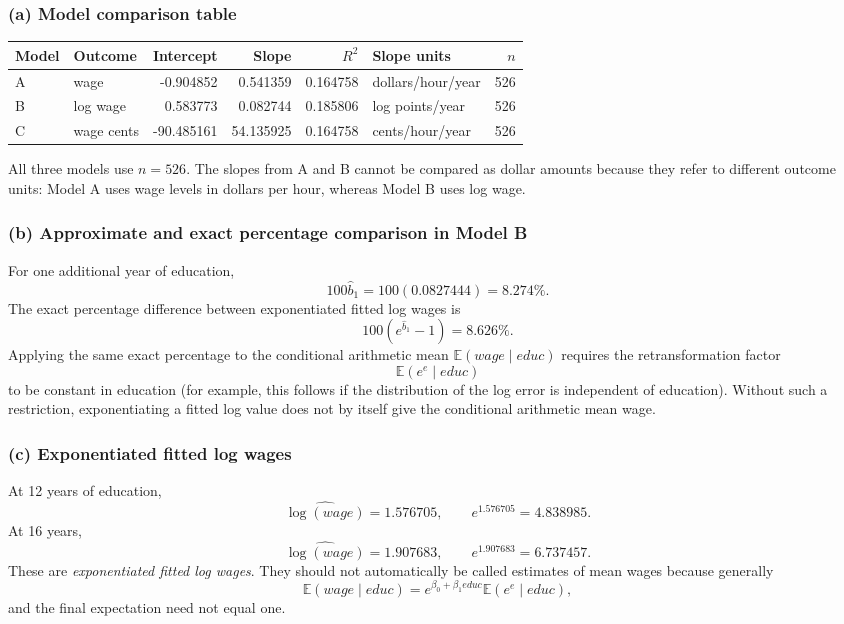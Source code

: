 \documentclass[11pt,a4paper]{article}
\newcommand{\E}{\mathbb{E}}
\begin{document}
\subsubsection*{(a) Model comparison table}
\begin{center}
\begin{tabular}{p{1.4cm}p{1.8cm}rrrp{3.2cm}r}
\toprule
Model & Outcome & Intercept & Slope & $R^2$ & Slope units & $n$\\
\midrule
A & wage & -0.904852 & 0.541359 & 0.164758 & dollars/hour/year & 526\\
B & log wage & 0.583773 & 0.082744 & 0.185806 & log points/year & 526\\
C & wage cents & -90.485161 & 54.135925 & 0.164758 & cents/hour/year & 526\\
\bottomrule
\end{tabular}
\end{center}
All three models use $n=526$. The slopes from A and B cannot be compared as dollar amounts because they refer to different outcome units: Model A uses wage levels in dollars per hour, whereas Model B uses log wage.

\subsubsection*{(b) Approximate and exact percentage comparison in Model B}
For one additional year of education,
\[
 100\hat b_1
 =100(0.0827444)
 =\boxed{8.274\%}.
\]
The exact percentage difference between exponentiated fitted log wages is
\[
 100\left(e^{\hat b_1}-1\right)
 =\boxed{8.626\%}.
\]
Applying the same exact percentage to the conditional arithmetic mean $\E(wage\mid educ)$ requires the retransformation factor
\[
 \E(e^e\mid educ)
\]
to be constant in education (for example, this follows if the distribution of the log error is independent of education). Without such a restriction, exponentiating a fitted log value does not by itself give the conditional arithmetic mean wage.

\subsubsection*{(c) Exponentiated fitted log wages}
At 12 years of education,
\[
 \widehat{\log(wage)}=1.576705,
 \qquad
 e^{1.576705}=\boxed{4.838985}.
\]
At 16 years,
\[
 \widehat{\log(wage)}=1.907683,
 \qquad
 e^{1.907683}=\boxed{6.737457}.
\]
These are \emph{exponentiated fitted log wages}. They should not automatically be called estimates of mean wages because generally
\[
 \E(wage\mid educ)
 =e^{\beta_0+\beta_1educ}\E(e^e\mid educ),
\]
and the final expectation need not equal one.
\end{document}
